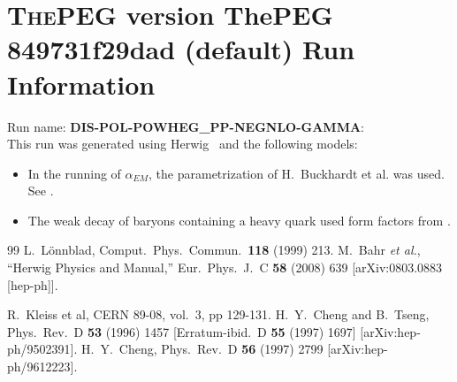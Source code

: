 \documentclass{article}
\begin{document}
\appendix
\section[xxx]{\textsc{ThePEG} version ThePEG 849731f29dad (default) \cite{ThePEG} Run Information}
Run name: \textbf{DIS-POL-POWHEG_PP-NEGNLO-GAMMA}:\\
This run was generated using Herwig~\cite{Bahr:2008pv} and the following models:
\begin{itemize}
\item In the running of $\alpha_{EM}$, the parametrization of H.~Buckhardt et al. was used. See \cite{KLEISSCERN9808v3pp129}.
\item The weak decay of baryons containing a heavy quark used form factors from \cite{Cheng:1995fe,Cheng:1996cs}.
\end{itemize}

\begin{thebibliography}{99}
 L.~L\"onnblad, Comput.~Phys.~Commun.\ {\bf 118} (1999) 213.
  M.~Bahr {\it et al.},
  ``Herwig Physics and Manual,''
  Eur.\ Phys.\ J.\  C {\bf 58} (2008) 639
  [arXiv:0803.0883 [hep-ph]].

 R.~Kleiss et al, CERN 89-08, vol.~3, pp 129-131.
  H.~Y.~Cheng and B.~Tseng,
  Phys.\ Rev.\  D {\bf 53} (1996) 1457
  [Erratum-ibid.\  D {\bf 55} (1997) 1697]
  [arXiv:hep-ph/9502391].
  H.~Y.~Cheng,
  Phys.\ Rev.\  D {\bf 56} (1997) 2799
  [arXiv:hep-ph/9612223].

\end{thebibliography}
\end{document}
